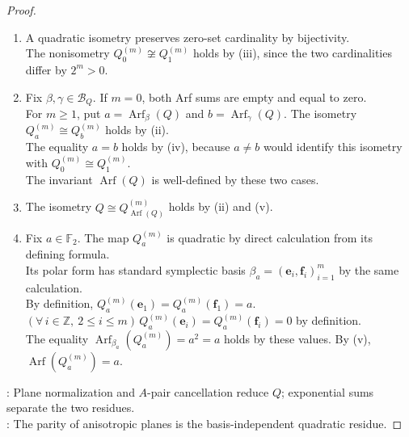 \begin{theorem}
\begin{proof}
\begin{enumerate}[label=(\roman*)]
$D(H)=1+1+1-1=2$ and $D(A)=1-1-1-1=-2$ by direct calculation.\\
The form $Q_0^{(m)}$ is the orthogonal sum of $m$ copies of $H$ by definition.\\
The form $Q_1^{(m)}$ is the orthogonal sum of one $A$ and $m-1$ copies of $H$ by definition.\\
The equality $D(Q_a^{(m)})=(-1)^a2^m$ holds by multiplicativity, $D(H)=2$, and $D(A)=-2$. Put $N_a=\lvert(Q_a^{(m)})^{-1}(0)\rvert$.\\
By $D(Q_a^{(m)})=N_a-(4^m-N_a)=2N_a-4^m$, $N_a=2^{2m-1}+(-1)^a2^{m-1}$.
\item A quadratic isometry preserves zero-set cardinality by bijectivity.\\
The nonisometry $Q_0^{(m)}\not\cong Q_1^{(m)}$ holds by (iii), since the two cardinalities differ by $2^m>0$.
\item Fix $\beta,\gamma\in\mathscr{B}_Q$. If $m=0$, both Arf sums are empty and equal to zero.\\
For $m\geq1$, put $a=\operatorname{Arf}_{\beta}(Q)$ and $b=\operatorname{Arf}_{\gamma}(Q)$. The isometry $Q_a^{(m)}\cong Q_b^{(m)}$ holds by (ii).\\
The equality $a=b$ holds by (iv), because $a\neq b$ would identify this isometry with $Q_0^{(m)}\cong Q_1^{(m)}$.\\
The invariant $\operatorname{Arf}(Q)$ is well-defined by these two cases.
\item The isometry $Q\cong Q_{\operatorname{Arf}(Q)}^{(m)}$ holds by (ii) and (v).
\item Fix $a\in\mathbb{F}_2$. The map $Q_a^{(m)}$ is quadratic by direct calculation from its defining formula.\\
Its polar form has standard symplectic basis $\beta_a=(\mathbf{e}_i,\mathbf{f}_i)_{i=1}^{m}$ by the same calculation.\\
By definition, $Q_a^{(m)}(\mathbf{e}_1)=Q_a^{(m)}(\mathbf{f}_1)=a$. $(\forall\,i\in\mathbb{Z},\ 2\leq i\leq m)\,Q_a^{(m)}(\mathbf{e}_i)=Q_a^{(m)}(\mathbf{f}_i)=0$ by definition.\\
The equality $\operatorname{Arf}_{\beta_a}(Q_a^{(m)})=a^2=a$ holds by these values. By (v), $\operatorname{Arf}(Q_a^{(m)})=a$.
\end{enumerate}
: Plane normalization and $A$-pair cancellation reduce $Q$; exponential sums separate the two residues.\\
: The parity of anisotropic planes is the basis-independent quadratic residue.
\end{proof}
\end{theorem}
